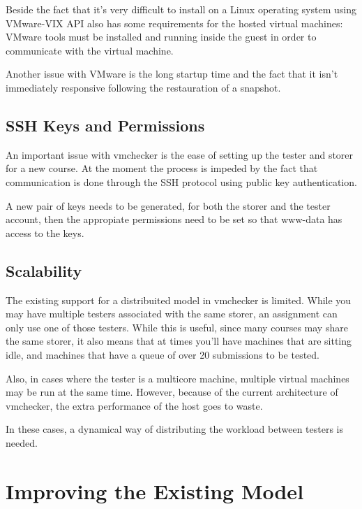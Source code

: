 Beside the fact that it's very difficult to install on a Linux operating system
using VMware-VIX API also has some requirements for the hosted virtual machines:
VMware tools must be installed and running inside the guest in order to communicate
with the virtual machine.

Another issue with VMware is the long startup time and the fact that it isn't 
immediately responsive following the restauration of a snapshot.

\subsection{SSH Keys and Permissions}
\label{sub-sec:vmc-analysis-ssh}

An important issue with vmchecker is the ease of setting up the tester and storer
for a new course. At the moment the process is impeded by the fact that communication
is done through the SSH protocol using public key authentication. 

A new pair of keys needs to be generated, for both the storer and the tester account,
then the appropiate permissions need to be set so that www-data has access to 
the keys.


\subsection{Scalability}
\label{sub-sec:vmc-analysis-scalability}

The existing support for a distribuited model in vmchecker is limited. While
you may have multiple testers associated with the same storer, an assignment
can only use one of those testers. While this is useful, since many courses
may share the same storer, it also means that at times you'll have machines
that are sitting idle, and machines that have a queue of over 20 submissions
to be tested.

Also, in cases where the tester is a multicore machine, multiple virtual
machines may be run at the same time. However, because of the current architecture 
of vmchecker, the extra performance of the host goes to waste.

In these cases, a dynamical way of distributing the workload between testers is 
needed.

\section{Improving the Existing Model}
\label{sec:vmc-improving}

